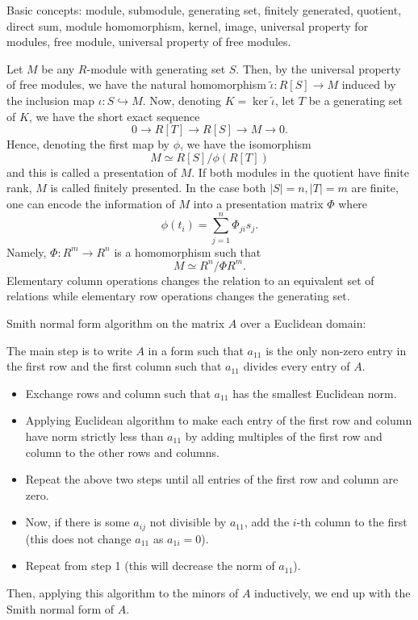 \documentclass[]{article}
\theoremstyle{definition}
\begin{document}
Basic concepts: module, submodule, generating set, finitely generated, quotient, direct sum, 
module homomorphism, kernel, image, universal property for modules, free module, universal 
property of free modules.

Let \(M\) be any \(R\)-module with generating set \(S\). Then, 
by the universal property of free modules, we have the natural homomorphism 
\(\tilde \iota : R[S] \to M\) induced by the inclusion map \(\iota : S \hookrightarrow M\).
Now, denoting \(K = \ker \tilde \iota\), let \(T\) be a generating set of \(K\), 
we have the short exact sequence 
\[0 \to R[T] \to R[S] \to M \to 0.\]
Hence, denoting the first map by \(\phi\), we have the isomorphism 
\[M \simeq R[S] / \phi(R[T])\]
and this is called a presentation of \(M\). If both modules in the quotient have finite 
rank, \(M\) is called finitely presented. In the case both \(|S| = n, |T| = m\) are finite, 
one can encode the information of \(M\) into a presentation matrix \(\Phi\) where 
\[\phi(t_i) = \sum_{j = 1}^n \Phi_{ji}s_j.\]
Namely, \(\Phi : R^m \to R^n\) is a homomorphism such that 
\[M \simeq R^n / \Phi R^m.\]
Elementary column operations changes the relation to an equivalent set of relations 
while elementary row operations changes the generating set.

Smith normal form algorithm on the matrix \(A\) over a Euclidean domain:

The main step is to write \(A\) in a form such that \(a_{11}\) is the only 
non-zero entry in the first row and the first column such that \(a_{11}\) divides every entry of \(A\).
\begin{itemize}
  \item Exchange rows and column such that \(a_{11}\) has the smallest Euclidean norm.
  \item Applying Euclidean algorithm to make each entry of the first row and column 
    have norm strictly less than \(a_{11}\) by adding multiples of the first row and 
    column to the other rows and columns.
  \item Repeat the above two steps until all entries of the first row and column are zero. 
  \item Now, if there is some \(a_{ij}\) not divisible by \(a_11\), add the \(i\)-th column 
    to the first (this does not change \(a_{11}\) as \(a_{1i} = 0\)).
  \item Repeat from step 1 (this will decrease the norm of \(a_{11}\)).
\end{itemize}
Then, applying this algorithm to the minors of \(A\) inductively, we end up with the 
Smith normal form of \(A\).  
\end{document}
